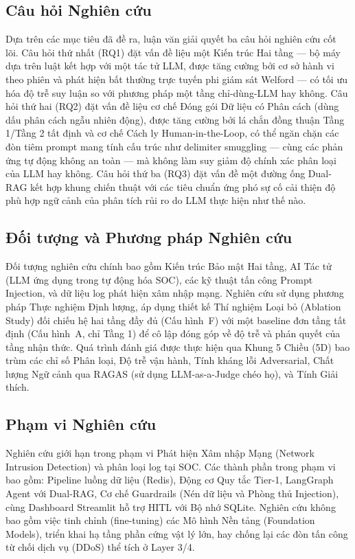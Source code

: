 \documentclass[12pt,a4paper]{article}
\begin{document}
\subsection{Câu hỏi Nghiên cứu}
Dựa trên các mục tiêu đã đề ra, luận văn giải quyết ba câu hỏi nghiên cứu cốt lõi. Câu hỏi thứ nhất (RQ1) đặt vấn đề liệu một Kiến trúc Hai tầng --- bộ máy dựa trên luật kết hợp với một tác tử LLM, được tăng cường bởi cơ sở hành vi theo phiên và phát hiện bất thường trực tuyến phi giám sát Welford --- có tối ưu hóa độ trễ suy luận so với phương pháp một tầng chỉ-dùng-LLM hay không. Câu hỏi thứ hai (RQ2) đặt vấn đề liệu cơ chế Đóng gói Dữ liệu có Phân cách (dùng dấu phân cách ngẫu nhiên động), được tăng cường bởi lá chắn đồng thuận Tầng 1/Tầng 2 tất định và cơ chế Cách ly Human-in-the-Loop, có thể ngăn chặn các đòn tiêm prompt mang tính cấu trúc như delimiter smuggling --- cùng các phản ứng tự động không an toàn --- mà không làm suy giảm độ chính xác phân loại của LLM hay không. Câu hỏi thứ ba (RQ3) đặt vấn đề một đường ống Dual-RAG kết hợp khung chiến thuật với các tiêu chuẩn ứng phó sự cố cải thiện độ phù hợp ngữ cảnh của phân tích rủi ro do LLM thực hiện như thế nào.

\subsection{Đối tượng và Phương pháp Nghiên cứu}
Đối tượng nghiên cứu chính bao gồm Kiến trúc Bảo mật Hai tầng, AI Tác tử (LLM ứng dụng trong tự động hóa SOC), các kỹ thuật tấn công Prompt Injection, và dữ liệu log phát hiện xâm nhập mạng.
Nghiên cứu sử dụng phương pháp Thực nghiệm Định lượng, áp dụng thiết kế Thí nghiệm Loại bỏ (Ablation Study) đối chiếu hệ hai tầng đầy đủ (Cấu hình~F) với một baseline đơn tầng tất định (Cấu hình~A, chỉ Tầng 1) để cô lập đóng góp về độ trễ và phán quyết của tầng nhận thức. Quá trình đánh giá được thực hiện qua Khung 5 Chiều (5D) bao trùm các chỉ số Phân loại, Độ trễ vận hành, Tính kháng lỗi Adversarial, Chất lượng Ngữ cảnh qua RAGAS (sử dụng LLM-as-a-Judge chéo họ), và Tính Giải thích.

\subsection{Phạm vi Nghiên cứu}
Nghiên cứu giới hạn trong phạm vi Phát hiện Xâm nhập Mạng (Network Intrusion Detection) và phân loại log tại SOC. Các thành phần trong phạm vi bao gồm: Pipeline luồng dữ liệu (Redis), Động cơ Quy tắc Tier-1, LangGraph Agent với Dual-RAG, Cơ chế Guardrails (Nén dữ liệu và Phòng thủ Injection), cùng Dashboard Streamlit hỗ trợ HITL với Bộ nhớ SQLite. Nghiên cứu không bao gồm việc tinh chỉnh (fine-tuning) các Mô hình Nền tảng (Foundation Models), triển khai hạ tầng phần cứng vật lý lớn, hay chống lại các đòn tấn công từ chối dịch vụ (DDoS) thể tích ở Layer 3/4.
\end{document}
